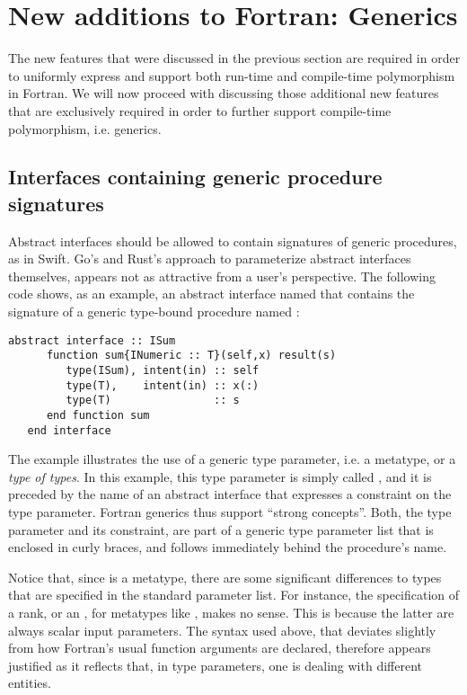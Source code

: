 \documentclass[11pt,oneside]{article}
\newcommand{\code}[1]{{\selectfont\ttfamily{#1}}}
\begin{document}
\newpage

\section{New additions to Fortran: Generics}

The new features that were discussed in the previous section are
required in order to uniformly express and support both run-time and
compile-time polymorphism in Fortran. We will now proceed with
discussing those additional new features that are exclusively required
in order to further support compile-time polymorphism, i.e. generics.

\subsection{Interfaces containing generic procedure signatures}
\label{sect:generic_interfaces}

Abstract interfaces should be allowed to contain signatures of generic
procedures, as in Swift. Go's and Rust's approach to parameterize
abstract interfaces themselves, appears not as attractive from a
user's perspective. The following code shows, as an example, an
abstract interface named \code{ISum} that contains the signature of a
generic type-bound procedure named \code{sum}:
\begin{lstlisting}[language=LFortran,style=boxed]
   abstract interface :: ISum
      function sum{INumeric :: T}(self,x) result(s)
         type(ISum), intent(in) :: self
         type(T),    intent(in) :: x(:)
         type(T)                :: s
      end function sum
   end interface
\end{lstlisting}

The example illustrates the use of a generic type parameter, i.e.  a
metatype, or a \emph{type of types}. In this example, this type
parameter is simply called \code{T}, and it is preceded by the name of
an abstract interface that expresses a constraint on the type
parameter. Fortran generics thus support ``strong concepts''. Both,
the type parameter and its constraint, are part of a generic type
parameter list that is enclosed in curly braces, and follows
immediately behind the procedure's name.


Notice that, since \code{T} is a metatype, there are some significant
differences to types that are specified in the standard parameter
list. For instance, the specification of a rank, or an \code{intent},
for metatypes like \code{T}, makes no sense. This is because the
latter are always scalar input parameters. The syntax used above,
that deviates slightly from how Fortran's usual function arguments are
declared, therefore appears justified as it reflects that, in type
parameters, one is dealing with different entities.
\end{document}
